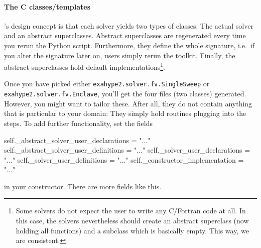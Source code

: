 \paragraph{The C classes/templates}

\ExaHyPE's design concept is that each solver yields two types of classes:
The actual solver and an abstract superclasses. 
Abstract superclasses are regenerated every time you rerun the Python script.
Furthermore, they define the whole signature, i.e.~if you alter the signature
later on, users simply rerun the toolkit. 
Finally, the abstract superclasses hold default implementations\footnote{Some
solvers do not expect the user to write any C/Fortran code at all. In this
case, the solvers nevertheless should create an abstract superclass (now
holding all functions) and a subclass which is basically empty. This way, we
are consistent.}.


Once you have picked either 
\texttt{exahype2.solver.fv.SingleSweep} or \linebreak
\texttt{exahype2.solver.fv.Enclave},
you'll get the four files (two classes) generated.
However, you might want to tailor these. 
After all, they do not contain anything that is particular to your domain: 
They simply hold routines plugging into the steps. 
To add further functionality, set the fields

\begin{code}
  self._abstract_solver_user_declarations  = "..."
  self._abstract_solver_user_definitions   = "..."
  self._solver_user_declarations           = "..."
  self._solver_user_definitions            = "..."
  self._constructor_implementation         = "..."
\end{code}

\noindent
in your constructor. 
There are more fields like this. 




